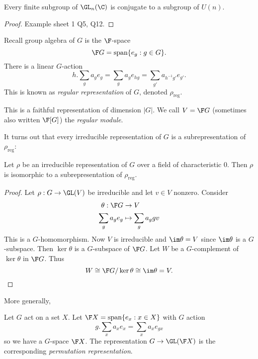 \documentclass[a4paper]{article}
\theoremstyle{definition}
\begin{document}
\begin{corollary}
  Every finite subgroup of \(\GL_n(\C)\) is conjugate to a subgroup of \(U(n)\).
\end{corollary}

\begin{proof}
  Example sheet 1 Q5, Q12.
\end{proof}

\begin{definition}
  Recall group algebra of \(G\) is the \(\F\)-space
  \[
    \F G = \text{span} \{e_g: g \in G\}.
  \]
  There is a linear \(G\)-action
  \[
    h . \sum_g a_ge_g = \sum_g a_g e_{hg} = \sum_{g'} a_{h^{-1}g'} e_{g'}.
  \]
  This is known as \emph{regular representation} of \(G\), denoted \(\rho_{\text{reg}}\).
\end{definition}

This is a faithful representation of dimension \(|G|\). We call \(V = \F G\) (sometimes also written \(\F[G]\)) the \emph{regular module}.

It turns out that every irreducible representation of \(G\) is a subrepresentation of \(\rho_{\text{reg}}\):

\begin{proposition}
  Let \(\rho\) be an irreducible representation of \(G\) over a field of characteristic \(0\). Then \(\rho\) is isomorphic to a subrepresentation of \(\rho_{\text{reg}}\).
\end{proposition}

\begin{proof}
  Let \(\rho: G \to \GL(V)\) be irreducible and let \(v \in V\) nonzero. Consider
  \begin{align*}
    \theta: \F G &\to V \\
    \sum_g a_g e_g &\mapsto \sum_g a_g gv
  \end{align*}
  This is a \(G\)-homomorphism. Now \(V\) is irreducible and \(\im \theta = V\) since \(\im \theta\) is a \(G\)-subspace. Then \(\ker \theta\) is a \(G\)-subspace of \(\F G\). Let \(W\) be a \(G\)-complement of \(\ker \theta\) in \(\F G\). Thus
  \[
    W \cong \F G/ \ker \theta \cong \im \theta = V.
  \]
\end{proof}

More generally,

\begin{definition}
  Let \(G\) act on a set \(X\). Let \(\F X = \text{span}\{e_x: x \in X\}\) with \(G\) action
  \[
    g . \sum_x a_x e_x = \sum_x a_x e_{gx}
  \]
  so we have a \(G\)-space \(\F X\). The representation \(G \to \GL(\F X)\) is the corresponding \emph{permutation representation}.
\end{definition}
\end{document}

